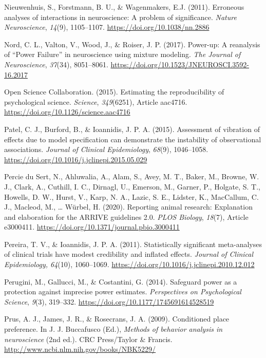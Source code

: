 \documentclass[authordate, meta, issue]{jote-new-article}
\begin{document}
	Nieuwenhuis, S., Forstmann, B. U., \& Wagenmakers, E.J. (2011). Erroneous analyses of interactions in neuroscience: A problem of significance. \emph{Nature Neuroscience}, \emph{14}(9), 1105--1107. \url{https://doi.org/10.1038/nn.2886}



	Nord, C. L., Valton, V., Wood, J., \& Roiser, J. P. (2017). Power-up: A reanalysis of “Power Failure” in neuroscience using mixture modeling. \emph{The Journal of Neuroscience}, \emph{37}(34), 8051--8061. \url{https://doi.org/10.1523/JNEUROSCI.3592-16.2017}



	Open Science Collaboration. (2015). Estimating the reproducibility of psychological science. \emph{Science}, \emph{349}(6251), Article aac4716. \url{https://doi.org/10.1126/science.aac4716}



	Patel, C. J., Burford, B., \& Ioannidis, J. P. A. (2015). Assessment of vibration of effects due to model specification can demonstrate the instability of observational associations. \emph{Journal of Clinical Epidemiology}, \emph{68}(9), 1046--1058. \url{https://doi.org/10.1016/j.jclinepi.2015.05.029}



	Percie du Sert, N., Ahluwalia, A., Alam, S., Avey, M. T., Baker, M., Browne, W. J., Clark, A., Cuthill, I. C., Dirnagl, U., Emerson, M., Garner, P., Holgate, S. T., Howells, D. W., Hurst, V., Karp, N. A., Lazic, S. E., Lidster, K., MacCallum, C. J., Macleod, M., … Würbel, H. (2020). Reporting animal research: Explanation and elaboration for the ARRIVE guidelines 2.0. \emph{PLOS Biology}, \emph{18}(7), Article e3000411. \url{https://doi.org/10.1371/journal.pbio.3000411}



	Pereira, T. V., \& Ioannidis, J. P. A. (2011). Statistically significant meta-analyses of clinical trials have modest credibility and inflated effects. \emph{Journal of Clinical Epidemiology, 64}(10), 1060--1069. \url{https://doi.org/10.1016/j.jclinepi.2010.12.012}



	Perugini, M., Gallucci, M., \& Costantini, G. (2014). Safeguard power as a protection against imprecise power estimates. \emph{Perspectives on Psychological Science}, \emph{9}(3), 319--332. \url{https://doi.org/10.1177/1745691614528519}



	Prus, A. J., James, J. R., \& Rosecrans, J. A. (2009). Conditioned place preference. In J. J. Buccafusco (Ed.), \emph{Methods of behavior analysis in neuroscience} (2nd ed.). CRC Press/Taylor \& Francis. \url{http://www.ncbi.nlm.nih.gov/books/NBK5229/}
\end{document}
